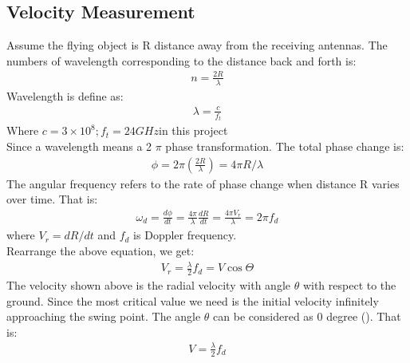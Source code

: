 \subsection{Velocity Measurement}
Assume the flying object is R distance away from the receiving antennas. The numbers of wavelength corresponding to the distance back and forth is:
\begin{align}
n=\frac{2 R}{\lambda}    
\end{align}
Wavelength is define as:
\begin{align}
\lambda=\frac{c}{f_{t}}
\end{align}
Where $c=3 \times 10^{8} ; f_{t}=24 G H z$in this project\\
Since a wavelength means a 2 $\pi$ phase transformation. The total phase change is:
\begin{align}
\phi=2 \pi\left(\frac{2 R}{\lambda}\right)=4 \pi R / \lambda
\end{align}
The angular frequency refers to the rate of phase change when distance R varies over time. That is:
\begin{align}
\omega_{d}=\frac{d \phi}{d t}=\frac{4 \pi}{\lambda} \frac{d R}{d t}=\frac{4 \pi V_{r}}{\lambda}=2 \pi f_{d}
\end{align}
where $V_{r}=d R / d t$ and $f_{d}$ is Doppler frequency.\\
Rearrange the above equation, we get:
\begin{align}
V_{r}=\frac{\lambda}{2} f_{d}=V \cos \Theta
\end{align}
The velocity shown above is the radial velocity with angle $\theta$ with respect to the ground. Since the most critical value we need is the initial velocity infinitely approaching the swing point. The angle $\theta$ can be considered as 0 degree (\cite{martin2012evaluation}). That is:
\begin{align}
V=\frac{\lambda}{2} f_{d}
\end{align}


